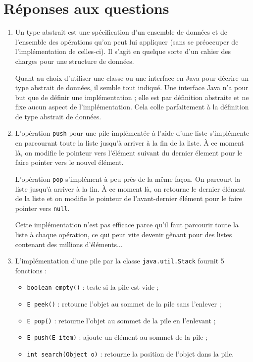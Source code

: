 

\section{Réponses aux questions}
\begin{enumerate}
	\item Un type abstrait est une spécification
	d'un ensemble de données et de l'ensemble des
	opérations qu'on peut lui appliquer (sans se
	préoccuper de l'implémentation de celles-ci).
	Il s'agit en quelque sorte d'un cahier des
	charges pour une structure de données.
	\cite{wiki-tad}\cite{mod-obj}
	
	Quant au choix d'utiliser une classe ou une
	interface en Java pour décrire un type abstrait
	de données, il semble tout indiqué. Une interface
	Java n'a pour but que de définir une implémentation ;
	elle est par définition abstraite et ne fixe aucun
	aspect de l'implémentation.\cite{nino} Cela colle
	parfaitement à la définition de type abstrait de
	données.
	\item L'opération \lstinline{push} pour une pile
	implémentée à l'aide d'une liste s'implémente en
	parcourant toute la liste jusqu'à arriver à la fin
	de la liste. \`{A} ce moment là, on modifie le
	pointeur vers l'élément suivant du dernier élement
	pour le faire pointer vers le nouvel élément.
	
	L'opération \lstinline{pop} s'implément à peu près
	de la même façon. On parcourt la liste jusqu'à
	arriver à la fin. \`{A} ce moment là, on retourne
	le dernier élément de la liste et on modifie le
	pointeur de l'avant-dernier élément pour le faire
	pointer vers \lstinline{null}.
	
	Cette implémentation n'est pas efficace parce qu'il
	faut parcourir toute la liste à chaque opération, ce
	qui peut vite devenir gênant pour des listes contenant
	des millions d'éléments...
	\item L'implémentation d'une pile par la classe
	\lstinline{java.util.Stack} fournit 5
	fonctions :
	\begin{itemize}
		\item \lstinline{boolean empty()} :
		teste si la pile est vide ;	
		\item \lstinline{E peek()} : retourne
		l'objet au sommet de la pile sans l'enlever ;
		\item \lstinline{E pop()} : retourne
		l'objet au sommet de la pile en l'enlevant ;
		\item \lstinline{E push(E item)} :
		ajoute un élément au sommet de la pile ;
		\item \lstinline{int search(Object o)} :
		retourne la position de l'objet dans la pile.
	\end{itemize}
	

\end{enumerate}

